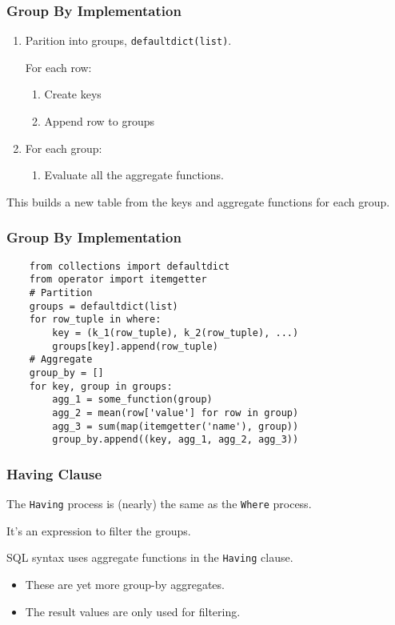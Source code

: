 \documentclass{beamer}
\begin{document}
\begin{frame}
    \frametitle{Group By Implementation}

    \begin{enumerate}
        \item Parition into groups, \texttt{defaultdict(list)}.

        For each row:
        \begin{enumerate}
            \item Create keys
            \item Append row to groups
        \end{enumerate}

        \item For each group:
        \begin{enumerate}
            \item Evaluate all the aggregate functions.
        \end{enumerate}

    \end{enumerate}

    \vspace{1em}
    This builds a new table from the keys and aggregate functions for each group.
\end{frame}

\begin{frame}[fragile]
    \frametitle{Group By Implementation}

    \begin{verbatim}
    from collections import defaultdict
    from operator import itemgetter
    # Partition
    groups = defaultdict(list)
    for row_tuple in where:
        key = (k_1(row_tuple), k_2(row_tuple), ...)
        groups[key].append(row_tuple)
    # Aggregate
    group_by = []
    for key, group in groups:
        agg_1 = some_function(group)
        agg_2 = mean(row['value'] for row in group)
        agg_3 = sum(map(itemgetter('name'), group))
        group_by.append((key, agg_1, agg_2, agg_3))
    \end{verbatim}

\end{frame}

\begin{frame}
    \frametitle{Having Clause}

    The \texttt{Having} process is (nearly) the same as the \texttt{Where} process.

    It's an expression to filter the groups.

    \vspace{1em}

    SQL syntax uses aggregate functions in the \texttt{Having} clause.

    \begin{itemize}
        \item These are yet more group-by aggregates.

        \item The result values are only used for filtering.
    \end{itemize}

\end{frame}
\end{document}
